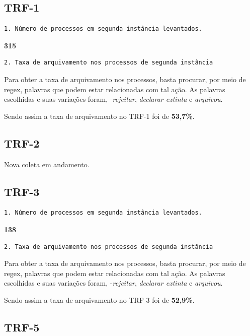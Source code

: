\documentclass[12pt]{article}
\begin{document}
\subsection{TRF-1}\label{trf-1}

\begin{verbatim}
1. Número de processos em segunda instância levantados.
\end{verbatim}

\textbf{315}

\begin{verbatim}
2. Taxa de arquivamento nos processos de segunda instância
\end{verbatim}

Para obter a taxa de arquivamento nos processos, basta procurar, por
meio de regex, palavras que podem estar relacionadas com tal ação. As
palavras escolhidas e suas variações foram, -\emph{rejeitar},
\emph{declarar extinta} e \emph{arquivou}.

Sendo assim a taxa de arquivamento no TRF-1 foi de \textbf{53,7\%}.

\subsection{TRF-2}\label{trf-2}

Nova coleta em andamento.

\subsection{TRF-3}\label{trf-3}

\begin{verbatim}
1. Número de processos em segunda instância levantados.
\end{verbatim}

\textbf{138}

\begin{verbatim}
2. Taxa de arquivamento nos processos de segunda instância
\end{verbatim}

Para obter a taxa de arquivamento nos processos, basta procurar, por
meio de regex, palavras que podem estar relacionadas com tal ação. As
palavras escolhidas e suas variações foram, -\emph{rejeitar},
\emph{declarar extinta} e \emph{arquivou}.

Sendo assim a taxa de arquivamento no TRF-3 foi de \textbf{52,9\%}.

\subsection{TRF-5}\label{trf-5}
\end{document}
